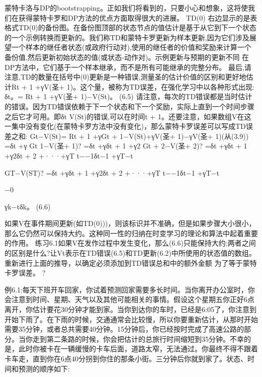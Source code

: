 蒙特卡洛与DP的bootstrapping。正如我们将看到的，只要小心和想象，这将使我们在获得蒙特卡罗和DP方法的优点方面取得很大的进展。
TD(0)
右边显示的是表格式TD(0)的备份图。在备份图顶部的状态节点的值估计是基于从它到下一个状态的一个示例转换而更新的。我们称TD和蒙特卡罗更新为样本更新,因为它们涉及展望一个样本的继任者状态(或政府行动对),使用的继任者的价值和奖励来计算一个备份值,然后更新初始状态的值(或状态-动作对)。示例更新与预期的更新不同
在DP方法中，它们基于一个样本继承，而不是所有可能继承的完整分布。
最后,请注意,TD的数量在括号中(0)更新是一种错误,测量圣的估计价值的区别和更好地估计Rt + 1 +γV(圣+ 1)。这个量，被称为TD误差，在强化学习中以各种形式出现:
δt。= Rt + 1 +γV(圣+ 1)−V(St)。 					(6.5)
请注意，每次的TD错误都是当时估计的错误。因为TD错误依赖于下一个状态和下一个奖励，实际上直到一个时间步骤之后它才可用。即δt V(St)的错误,可以在时间t + 1。还要注意，如果数组V在这一集中没有变化(在蒙特卡罗方法中没有变化)，那么蒙特卡罗误差可以写成TD误差之和:
Gt−V(St)= Rt + 1 +γGt + 1−V(St)+γV(圣+ 1)−γV(圣+ 1)(从(3.9))
=δt +γ
Gt  1−V(圣+ 1)?
=δt +γδt + 1 +γ2
Gt + 2−V(圣+ 2)?
=δt +γδt + 1 +γ2δt + 2 +···+γT t−−1δt−1 +γT−t

GT−V(ST)?
=δt +γδt + 1 +γ2δt + 2 +···+γT t−−1δt−1 +γT−t

−0

γk−tδk。 					(6.6)

如果V在事件期间更新(如TD(0)))，则该标识并不准确，但是如果步骤大小很小，那么它仍然可以保持大约。这种同一性的归纳在时变学习的理论和算法中起着重要的作用。
练习6.1如果V在发作过程中发生变化，那么(6.6)只能保持大约;两者之间的区别是什么?让Vt表示在TD错误(6.5)和TD更新(6.2)中所使用的状态值的数组。重新进行上面的推导，以确定必须添加到TD错误总和中的额外金额
为了等于蒙特卡罗误差。 					?

例6.1:每天下班开车回家，你试着预测回家需要多长时间。当你离开办公室时，你会注意到时间、星期、天气以及其他可能相关的事情。假设这个星期五你正好6点离开，你估计要花30分钟才能到家。当你到达你的车时，已经是6:05了，你注意到开始下雨了。在下雨的时候，交通通常会比较慢，所以你要重新估计，从那时开始需要35分钟，或者总共需要40分钟。15分钟后，你已经按时完成了高速公路的部分。当你走到第二条路的时候，你会把估计的总旅行时间缩短到35分钟。不幸的是，此时你被卡在一辆缓慢的卡车后面，道路太窄，无法通过。你最终不得不跟着卡车走，直到你在6点40分拐到你住的那条小街。三分钟后你就到家了。状态、时间和预测的顺序如下:


